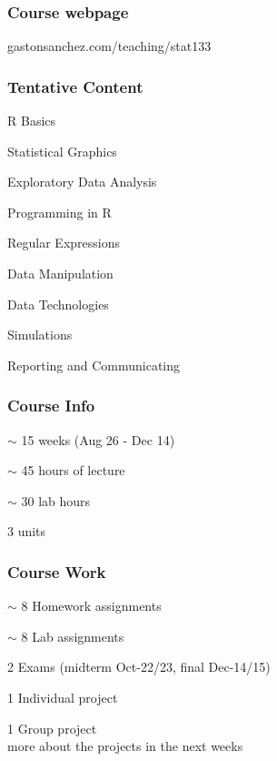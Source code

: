 \documentclass[12pt]{beamer}\usepackage[]{graphicx}\usepackage[]{color}
\begin{document}

\begin{frame}
\begin{center}
\Huge{}
\end{center}
\end{frame}


\begin{frame}
\frametitle{Course webpage}
\begin{center}
\Large{gastonsanchez.com/teaching/stat133}
\end{center}
\end{frame}


\begin{frame}
\frametitle{Tentative Content}

\bi
 \item R Basics
 \item Statistical Graphics
 \item Exploratory Data Analysis
 \item Programming in R
 \item Regular Expressions
 \item Data Manipulation
 \item Data Technologies
 \item Simulations
 \item Reporting and Communicating
\ei

\end{frame}


\begin{frame}
\frametitle{Course Info}

\bbi
 \item $\sim$ 15 weeks (Aug 26 - Dec 14)
 \item $\sim$ 45 hours of lecture
 \item $\sim$ 30 lab hours
 \item 3 units
\ei

\end{frame}


\begin{frame}
\frametitle{Course Work}

\bbi
 \item $\sim$ 8 Homework assignments
 \item $\sim$ 8 Lab assignments
 \item 2 Exams (midterm Oct-22/23, final Dec-14/15)
 \item 1 Individual project \\ 
 \item 1 Group project \\
{\lit more about the projects in the next weeks}
\ei
\eb

\end{frame}
\end{document}
